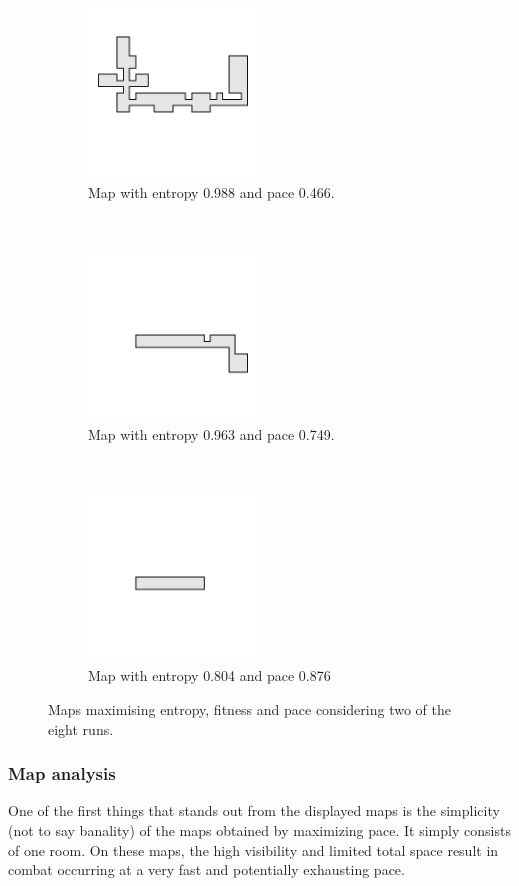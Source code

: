\begin{figure}[hbtp]
\begin{subfigure}[t]{0.3\textwidth}
        \centering
        \includegraphics[height=4.5cm]{Images/images/experiment_one/best_entropy_pop_1/map.png}
        \caption{Map with entropy 0.988 and pace 0.466.}
        \label{fig:best_entropy_map_1}
    \end{subfigure}%
    ~ 
    \begin{subfigure}[t]{0.3\textwidth}
        \centering
        \includegraphics[height=4.5cm]{Images/images/experiment_one/best_fitness_pop_1/map.png}
        \caption{Map with entropy 0.963 and pace 0.749.}
        \label{fig:best_fitness_map_1}
    \end{subfigure}
    ~ 
    \begin{subfigure}[t]{0.3\textwidth}
        \centering
        \includegraphics[height=4.5cm]{Images/images/experiment_one/best_pace_pop_1/map.png}
        \caption{Map with entropy 0.804 and pace 0.876}
        \label{fig:best_pace_map_1}
    \end{subfigure}
    \caption{Maps maximising entropy, fitness and pace considering two of the eight runs.}
    \label{fig:ex_one_maps}
\end{figure}


\subsubsection{Map analysis}
One of the first things that stands out from the displayed maps is the simplicity (not to say banality) of the maps obtained by maximizing pace. It simply consists of one room. On these maps, the high visibility and limited total space result in combat occurring at a very fast and potentially exhausting pace. 

